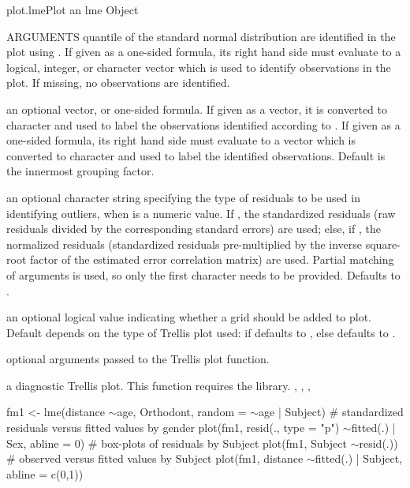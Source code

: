 \documentclass[pdftex]{article} \usepackage{url,graphicx}
\renewcommand{\Twiddle}{\mbox{\(\sim\)}}
\begin{document}
\begin{Helpfile}{plot.lme}{Plot an lme Object}
\begin{Argument}{ARGUMENTS}
quantile of the standard normal distribution are identified in the
plot using . If given as a one-sided formula, its
right hand side must evaluate to a  logical, integer, or character
vector which is used to identify observations in the plot. If
missing, no observations are identified.
\item[\Co{idLabels:}]
an optional vector, or one-sided formula. If given as a
vector, it is converted to character and used to label the
observations identified according to . If given as a
one-sided formula, its right hand side must evaluate to a vector
which is converted to character and used to label the identified
observations. Default is the innermost grouping factor. 
\item[\Co{idResType:}]
an optional character string specifying the type of
residuals to be used in identifying outliers, when  is a
numeric value. If , the standardized residuals (raw 
residuals divided by the corresponding standard errors) are used;
else, if , the normalized residuals (standardized
residuals pre-multiplied by the inverse square-root factor of the
estimated error correlation matrix) are used. Partial matching of
arguments is used, so only the first character needs to be
provided. Defaults to .
\item[\Co{grid:}]
an optional logical value indicating whether a grid should
be added to plot. Default depends on the type of Trellis plot used:
if  defaults to , else defaults to
.
\item[\Co{...:}]
optional arguments passed to the Trellis plot function.
\end{Argument}
a diagnostic Trellis plot.
 This function requires the  library.
, , ,
\need 15pt
\vspace{-16pt} 
\begin{Example}
fm1 <- lme(distance \Twiddle age, Orthodont, random = \Twiddle age | Subject)
# standardized residuals versus fitted values by gender
plot(fm1, resid(., type = "p") \Twiddle fitted(.) | Sex, abline = 0)
# box-plots of residuals by Subject
plot(fm1, Subject \Twiddle resid(.))
# observed versus fitted values by Subject
plot(fm1, distance \Twiddle fitted(.) | Subject, abline = c(0,1))
\end{Example}
\end{Helpfile}
\end{document}
